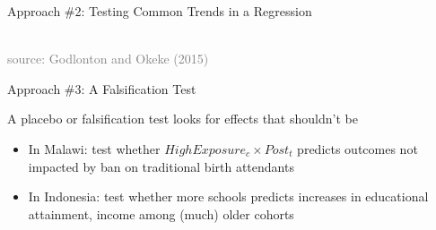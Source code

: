 \documentclass[10pt,xcolor=table,ignorenonframetext,handout,aspectratio=169]{beamer}
\newlength{\wideitemsep}
\let\olditem\item
\renewcommand{\item}{\setlength{\itemsep}{\wideitemsep}\olditem}
\begin{document}

\begin{frame}{Approach \#2:  Testing Common Trends in a Regression}

\medskip
\begin{center}
 \\

\tiny{\textcolor{gray}{source:  Godlonton and Okeke (2015)}}
\end{center}

\end{frame}



\begin{frame}{Approach \#3:  A Falsification Test}

\medskip
A placebo or falsification test looks for effects that shouldn't be

\medskip
\begin{itemize}

\item In Malawi:  test whether $HighExposure_c \times Post_t$ predicts outcomes not impacted by ban on traditional birth attendants

\item In Indonesia:  test whether more schools predicts increases in educational attainment, income among (much) older cohorts

\end{itemize}


\end{frame}


\end{document}

